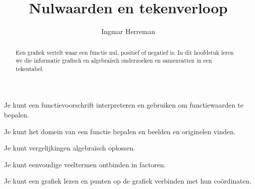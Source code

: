 \documentclass{ximera}
\title{Nulwaarden en tekenverloop}
\author{Ingmar Herreman}
\begin{document}



\begin{abstract}
Een grafiek vertelt waar een functie nul, positief of negatief is.
In dit hoofdstuk leren we die informatie grafisch en algebraïsch
onderzoeken en samenvatten in een tekentabel.
\end{abstract}

\maketitle

\begin{voorkennis}

    \item Je kunt een functievoorschrift interpreteren en gebruiken om functiewaarden te bepalen.
  
    \item Je kunt het domein van een functie bepalen en beelden en originelen vinden.
  
    \item Je kunt vergelijkingen algebraïsch oplossen.
  
    \item Je kunt eenvoudige veeltermen ontbinden in factoren.
  
    \item Je kunt een grafiek lezen en punten op de grafiek verbinden met hun coördinaten.
  
  \end{voorkennis}
  
\end{document}
